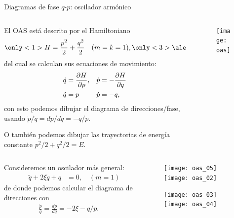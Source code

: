 \documentclass[aspectratio=169,xcolor=dvipsnames,7pt]{beamer}
\begin{document}
\begin{frame}[allowframebreaks]{Diagramas de fase $q$-$p$: oscilador armónico}


\begin{columns}
\begin{column}{0.59\textwidth}  %
El OAS está descrito por el Hamiltoniano
\begin{align*}
\only<1>{H = \frac{p^2}{2} + \frac{q^2}{2}}\quad (m=k=1),
\only<3>{\alert{\frac{p^2}{2} + \frac{q^2}{2}= E}}
\end{align*}
del cual se calculan sus ecuaciones de movimiento:
\begin{align*}
\dot q &= \pdv{H}{p}, & \dot p &= - \pdv{H}{q} \\
\dot q &=p & \dot p &=-q,
\end{align*}
con esto podemos dibujar el diagrama de direcciones/fase, 
usando $\dot p/\dot q = dp/dq = -q/p$. \vspace*{.5cm}

O también podemos dibujar las \alert{trayectorias de energía constante}
$p^2/2+q^2/2=E$.
\end{column}

\hspace*{-1.5cm}
\begin{column}{0.4\textwidth}  %
\begin{figure}
\texttt{[image: oas]}
\end{figure}

\end{column}
\end{columns}

\framebreak

\begin{columns}[t]
\begin{column}{0.5\textwidth}  %
\vspace*{1cm}

Consideremos un oscilador más general:
\begin{align*}
&& \ddot q + 2\xi\dot q + q &= 0,\quad (m=1)
\end{align*}
de donde podemos calcular el diagrama de direcciones con
\begin{align*}
\frac{\dot p}{\dot q} = \frac{dp}{dq} = -2\xi - q/p.
\end{align*} 
\end{column}

\hspace*{-1cm}
\begin{column}{0.5\textwidth}  %
\vspace*{-.9cm}
\begin{figure}
\texttt{[image: oas\_05]}
\texttt{[image: oas\_02]}

\texttt{[image: oas\_03]}
\texttt{[image: oas\_04]}
\end{figure}

\end{column}
\end{columns}
\end{frame}
\end{document}
